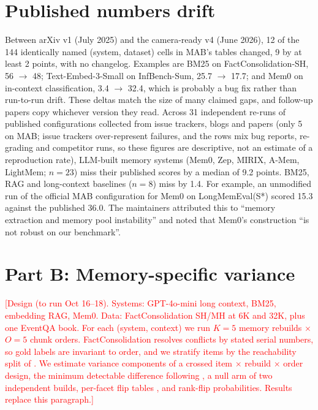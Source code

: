 \documentclass[11pt,a4paper]{article}
\newcommand{\tbd}[1]{\textcolor{red}{[#1]}}
\begin{document}
\section{Published numbers drift}
\label{sec:drift}
Between arXiv v1 (July 2025) and the camera-ready v4 (June 2026), 12 of the 144 identically named
(system, dataset) cells in MAB's tables changed, 9 by at least 2 points, with no changelog. Examples are BM25
on FactConsolidation-SH, 56 $\rightarrow$ 48; Text-Embed-3-Small on InfBench-Sum, 25.7 $\rightarrow$ 17.7;
and Mem0 on in-context classification, 3.4 $\rightarrow$ 32.4, which is probably a bug fix rather than run-to-run drift. These deltas match the size of many claimed
gaps, and follow-up papers copy whichever version they read. Across 31 independent re-runs of published
configurations collected from issue trackers, blogs and papers (only 5 on MAB; issue trackers over-represent
failures, and the rows mix bug reports, re-grading and competitor runs, so these figures are descriptive, not an
estimate of a reproduction rate), LLM-built memory systems (Mem0, Zep, MIRIX,
A-Mem, LightMem; $n=23$) miss their published scores by a median of 9.2 points. BM25, RAG and long-context
baselines ($n=8$) miss by 1.4. For example, an unmodified run of the official MAB configuration for Mem0 on
LongMemEval(S*) scored 15.3 against the published 36.0. The maintainers attributed this to ``memory extraction
and memory pool instability'' and noted that Mem0's construction ``is not robust on our benchmark''.

\section{Part B: Memory-specific variance}
\label{sec:partb}
\tbd{Design (to run Oct 16--18). Systems: GPT-4o-mini long context, BM25, embedding RAG, Mem0. Data:
FactConsolidation SH/MH at 6K and 32K, plus one EventQA book. For each (system, context) we run $K=5$ memory
rebuilds $\times$ $O=5$ chunk orders. FactConsolidation resolves conflicts by stated serial numbers, so gold
labels are invariant to order, and we stratify items by the reachability split of \citet{pakhomov2026bookkeeping}.
We estimate variance components of a crossed item $\times$ rebuild $\times$ order design, the minimum detectable
difference following \citet{anand2026askwhich}, a null arm of two independent builds, per-facet flip tables
\citep{chen2026noisefloor}, and rank-flip probabilities. Results replace this paragraph.}
\end{document}
